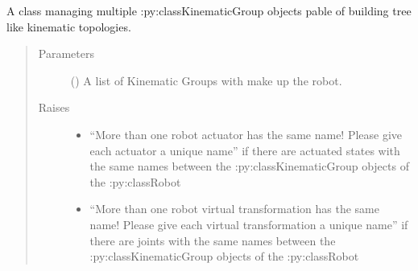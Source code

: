 \documentclass[letterpaper,10pt,english]{sphinxmanual}
\begin{document}
\begin{fulllineitems}
\label{\detokenize{code_docu:trip_kinematics.Robot.Robot}}
A class managing multiple :py:class\textasciigrave{}KinematicGroup\textasciigrave{} objects pable of building tree like kinematic topologies.
\begin{quote}\begin{description}
\item[{Parameters}] \leavevmode
{} (\sphinxstyleliteralemphasis{\sphinxupquote{{[}}}{\hyperref[\detokenize{code_docu:trip_kinematics.KinematicGroup.KinematicGroup}]{\sphinxcrossref{\sphinxstyleliteralemphasis{\sphinxupquote{KinematicGroup}}}}}\sphinxstyleliteralemphasis{\sphinxupquote{{]}}}) \textendash{} A list of Kinematic Groups with make up the robot.

\item[{Raises}] \leavevmode\begin{itemize}
\item {} 
 \textendash{} “More than one robot actuator has the same name! Please give each actuator a unique name”
    if there are actuated states with the same names between the :py:class\textasciigrave{}KinematicGroup\textasciigrave{} objects of the :py:class\textasciigrave{}Robot\textasciigrave{}

\item {} 
 \textendash{} “More than one robot virtual transformation has the same name! Please give each virtual transformation a unique name”
    if there are joints with the same names between the :py:class\textasciigrave{}KinematicGroup\textasciigrave{} objects of the :py:class\textasciigrave{}Robot\textasciigrave{}

\end{itemize}

\end{description}\end{quote}


\end{fulllineitems}
\end{document}
